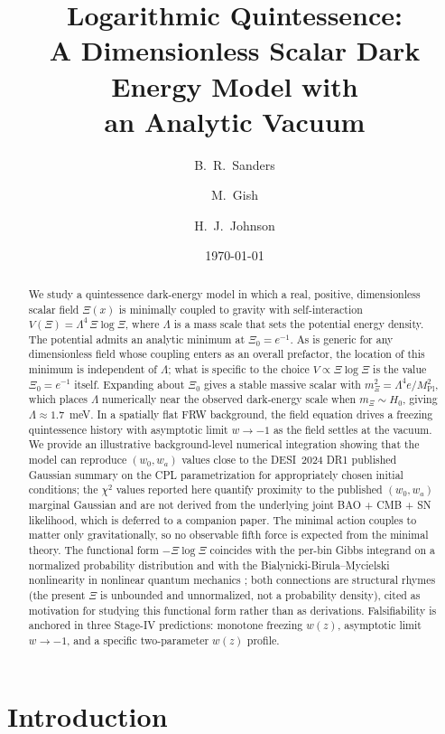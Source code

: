 \documentclass[11pt,reqno]{amsart}
\title[Logarithmic Quintessence]{Logarithmic Quintessence:\\
A Dimensionless Scalar Dark Energy Model with\\
an Analytic Vacuum}
\author{B.~R.~Sanders}
\author{M.~Gish}
\author{H.~J.~Johnson}
\date{\today}
\theoremstyle{plain}
\theoremstyle{definition}
\theoremstyle{remark}
\newcommand{\Pl}{\mathrm{Pl}}
\begin{document}
\begin{abstract}
We study a quintessence dark-energy model in which a real, positive,
dimensionless scalar field $\Xi(x)$ is minimally coupled to gravity with
self-interaction $V(\Xi) = \Lambda^{4}\,\Xi\log\Xi$, where $\Lambda$ is a
mass scale that sets the potential energy density. The potential admits an
analytic minimum at $\Xi_0 = e^{-1}$. As is generic for any dimensionless
field whose coupling enters as an overall prefactor, the location of this
minimum is independent of $\Lambda$; what is specific to the choice
$V \propto \Xi\log\Xi$ is the value $\Xi_0 = e^{-1}$ itself. Expanding about
$\Xi_0$ gives a stable massive scalar with
$m_\Xi^{2} = \Lambda^{4} e / M_\Pl^{2}$, which places $\Lambda$ numerically
near the observed dark-energy scale when $m_\Xi \sim H_0$, giving
$\Lambda \approx 1.7$~meV. In a spatially flat FRW background, the field
equation drives a freezing quintessence history with asymptotic limit
$w \to -1$ as the field settles at the vacuum. We provide an illustrative
background-level numerical integration showing that the model can reproduce
$(w_0, w_a)$ values close to the DESI~2024 DR1 published Gaussian summary
on the CPL parametrization for appropriately chosen initial conditions;
the $\chi^{2}$ values reported here quantify proximity to the published
$(w_0, w_a)$ marginal Gaussian and are not derived from the underlying
joint BAO + CMB + SN likelihood, which is deferred to a companion paper.
The minimal action couples to matter only gravitationally, so no
observable fifth force is expected from the minimal theory. The functional
form $-\Xi\log\Xi$ coincides with the per-bin Gibbs integrand on a
normalized probability distribution and with the
Bialynicki-Birula--Mycielski nonlinearity in nonlinear quantum mechanics
\cite{BialynickiBirulaMycielski1976}; both connections are structural
rhymes (the present $\Xi$ is unbounded and unnormalized, not a probability
density), cited as motivation for studying this functional form rather
than as derivations. Falsifiability is anchored in three Stage-IV
predictions: monotone freezing $w(z)$, asymptotic limit $w \to -1$, and a
specific two-parameter $w(z)$ profile.
\end{abstract}

\maketitle

\section{Introduction}
\end{document}
